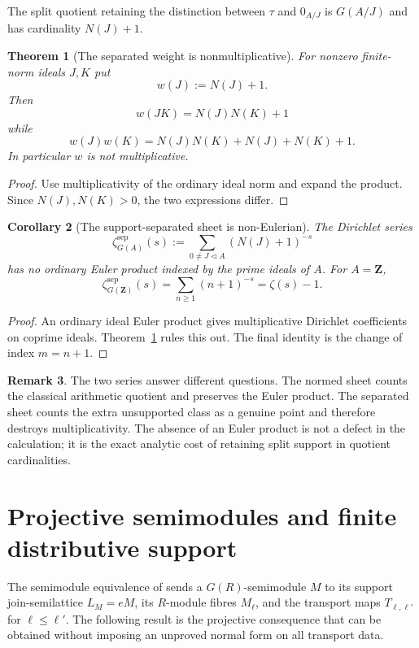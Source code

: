 \documentclass[11pt]{amsart}
\numberwithin{equation}{section}
\newtheorem{theorem}{Theorem}[section]
\newtheorem{corollary}[theorem]{Corollary}
\theoremstyle{definition}
\newtheorem{remark}[theorem]{Remark}
\newcommand{\Z}{\mathbf Z}
\begin{document}
The split quotient retaining the distinction between $\tau$ and $0_{A/J}$
is $G(A/J)$ and has cardinality $N(J)+1$.

\begin{theorem}[The separated weight is nonmultiplicative]
\label{thm:separated-weight}
For nonzero finite-norm ideals $J,K$ put
\[
w(J):=N(J)+1.
\]
Then
\[
w(JK)=N(J)N(K)+1
\]
while
\[
w(J)w(K)=N(J)N(K)+N(J)+N(K)+1.
\]
In particular $w$ is not multiplicative.
\end{theorem}

\begin{proof}
Use multiplicativity of the ordinary ideal norm and expand the product.
Since $N(J),N(K)>0$, the two expressions differ.
\end{proof}

\begin{corollary}[The support-separated sheet is non-Eulerian]
\label{cor:separated-non-eulerian}
The Dirichlet series
\[
\zeta^{\mathrm{sep}}_{G(A)}(s)
:=\sum_{0\ne J\triangleleft A}(N(J)+1)^{-s}
\]
has no ordinary Euler product indexed by the prime ideals of $A$.
For $A=\Z$,
\[
\zeta^{\mathrm{sep}}_{G(\Z)}(s)=\sum_{n\geq1}(n+1)^{-s}=\zeta(s)-1.
\]
\end{corollary}

\begin{proof}
An ordinary ideal Euler product gives multiplicative Dirichlet
coefficients on coprime ideals.  Theorem~\ref{thm:separated-weight} rules
this out.  The final identity is the change of index $m=n+1$.
\end{proof}

\begin{remark}
The two series answer different questions.  The normed sheet counts the
classical arithmetic quotient and preserves the Euler product.  The
separated sheet counts the extra unsupported class as a genuine point and
therefore destroys multiplicativity.  The absence of an Euler product is
not a defect in the calculation; it is the exact analytic cost of retaining
split support in quotient cardinalities.
\end{remark}

\section{Projective semimodules and finite distributive support}
\label{sec:projective-semimodules}

The semimodule equivalence of \cite{Secondary} sends a $G(R)$-semimodule
$M$ to its support join-semilattice $L_M=eM$, its $R$-module fibres
$M_\ell$, and the transport maps $T_{\ell,\ell'}$ for
$\ell\leq\ell'$.  The following result is the projective consequence that
can be obtained without imposing an unproved normal form on all transport
data.
\end{document}
